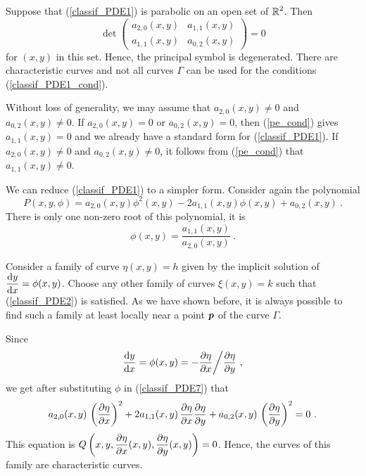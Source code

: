 Suppose that (\ref{classif_PDE1}) is parabolic on an open set of
$\displaystyle \mathbb{R}^2$.  Then
\begin{equation}\label{pe_cond}
\det \begin{pmatrix}
a_{2,0}(x,y) & a_{1,1}(x,y) \\
a_{1,1}(x,y) & a_{0,2}(x,y)  
\end{pmatrix}
=0
\end{equation}
for $(x,y)$ in this set.  Hence, the principal symbol is
degenerated.  There are characteristic curves and not all curves
$\Gamma$ can be used for the conditions
(\ref{classif_PDE1_cond}).

Without loss of generality, we may assume that $a_{2,0}(x,y) \neq 0$
and $a_{0,2}(x,y) \neq 0$.  If $a_{2,0}(x,y)=0$ or 
$a_{0,2}(x,y) =0$, then (\ref{pe_cond}) gives $a_{1,1}(x,y)=0$ and
we already have a standard form for (\ref{classif_PDE1}).  If
$a_{2,0}(x,y) \neq 0$ and $a_{0,2}(x,y) \neq 0$, it follows from
(\ref{pe_cond}) that $a_{1,1}(x,y) \neq 0$.

We can reduce (\ref{classif_PDE1}) to a simpler form.  Consider again
the polynomial
\begin{equation} \label{classif_PDE7}
P(x,y,\phi) = a_{2,0}(x,y) \phi^2(x,y) - 2a_{1,1}(x,y) \phi(x,y)
+ a_{0,2}(x,y) \ .
\end{equation}
There is only one non-zero root of this polynomial, it is
\[
\phi(x,y) = \frac{a_{1,1}(x,y)}{a_{2,0}(x,y)} \ .
\]

Consider a family of curve $\eta(x,y)=h$ given by the
implicit solution of $\displaystyle \frac{\mathrm{d}y}{\mathrm{d}{x}} = \phi(x,y)$.
Choose any other family of curves $\xi(x,y)=k$ such that
(\ref{classif_PDE2}) is satisfied.  As we have shown before, it is
always possible to find such a family at least locally near a point
${\bm{p}}$ of the curve $\Gamma$.

Since
\[
\frac{\mathrm{d}y}{\mathrm{d}{x}} = \phi(x,y) = -\frac{\partial{\eta}}{\partial x}\bigg/ \frac{\partial{\eta}}{\partial y} \ ,
\]
we get after substituting $\phi$ in
(\ref{classif_PDE7}) that
\begin{equation} \label{classif_ParEq1}
a_{2,0}(x,y) \,\left(\frac{\partial{\eta}}{\partial x}\right)^2 + 2a_{1,1}(x,y)\,
\frac{\partial{\eta}}{\partial x} \frac{\partial{\eta}}{\partial y}  +
a_{0,2}(x,y)\,\left(\frac{\partial{\eta}}{\partial y}\right)^2 = 0 \ .
\end{equation}
This equation is
$\displaystyle Q\left(x,y,\frac{\partial{\eta}}{\partial x}(x,y),\frac{\partial{\eta}}{\partial y}(x,y)\right) = 0$.
Hence, the curves of this family are characteristic curves.

